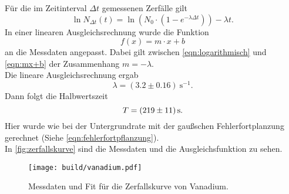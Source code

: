 Für die im Zeitinterval $\Delta t$ gemessenen Zerfälle gilt
\begin{equation}
	\ln N_{\Delta t}(t) = \ln(N_0 \cdot (1 - e^{-\lambda \Delta t})) - \lambda t.
	\label{eqn:logarithmisch}
\end{equation}
\noindent
In einer linearen Ausgleichsrechnung wurde die Funktion 
\begin{equation}
	f(x) = m \cdot x + b
	\label{eqn:mx+b}
\end{equation}
\noindent
an die Messdaten angepasst. Dabei gilt zwischen \autoref{eqn:logarithmisch} und \autoref{eqn:mx+b} der 
Zusammenhang $m = -\lambda$.
\\
Die lineare Ausgleichsrechnung ergab
\begin{equation}
	\lambda = (3.2 \pm 0.16) \ \si{\second}^{-1}.
\end{equation}
\noindent Dann folgt die Halbwertszeit
\begin{equation}
	T = \SI{219\pm11}{\second}.
\end{equation}
Hier wurde wie bei der Untergrundrate mit der gaußschen Fehlerfortplanzung gerechnet (Siehe 
\autoref{eqn:fehlerfortpflanzung}).
\\
In \autoref{fig:zerfallskurve} sind die Messdaten und die Ausgleichsfunktion zu sehen.

\begin{figure}[H]
	\centering
	\texttt{[image: build/vanadium.pdf]}
	\caption{Messdaten und Fit für die Zerfallskurve von Vanadium.}
	\label{fig:zerfallskurve}
\end{figure}
